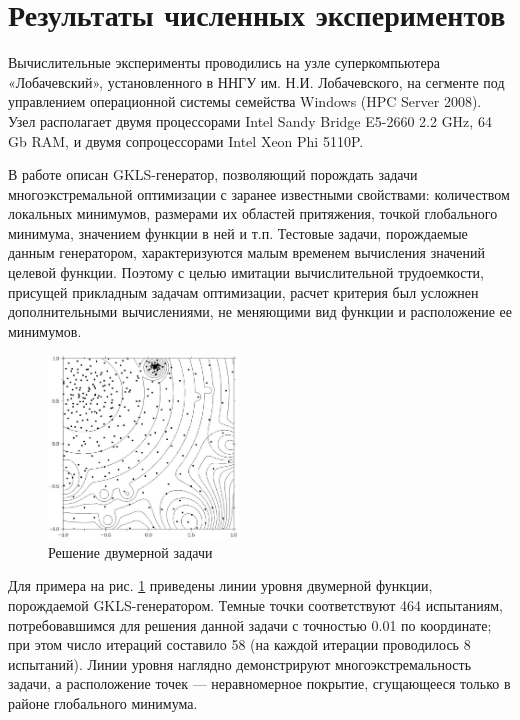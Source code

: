 \section{Результаты численных экспериментов}
Вычислительные эксперименты проводились на узле суперкомпьютера «Лобачевский», установленного в ННГУ им. Н.И. Лобачевского, на сегменте под управлением операционной системы семейства Windows (HPC Server 2008). Узел располагает двумя процессорами Intel Sandy Bridge E5-2660 2.2 GHz, 64 Gb RAM, и двумя сопроцессорами Intel Xeon Phi 5110P.
\par
В работе \cite{gklsPaper} описан GKLS-генератор, позволяющий порождать задачи многоэкстремальной оптимизации с заранее известными свойствами: количеством локальных минимумов, размерами их областей притяжения, точкой глобального минимума, значением функции в ней и т.п. Тестовые задачи, порождаемые данным генератором, характеризуются малым временем вычисления значений целевой функции. Поэтому с целью имитации вычислительной трудоемкости, присущей прикладным задачам оптимизации, расчет критерия был усложнен дополнительными вычислениями, не меняющими вид функции и расположение ее минимумов.
\begin{figure}[h!]
    \centering
		\includegraphics[width=0.45\textwidth]{isolines.png}
		\caption{Решение двумерной задачи}\label{fig:isolines}
\end{figure}
\par
Для примера на рис. \ref{fig:isolines} приведены линии уровня двумерной функции, порождаемой GKLS-генератором. Темные точки соответствуют 464 испытаниям, потребовавшимся для решения данной задачи с точностью 0.01 по координате; при этом число итераций составило 58 (на каждой итерации проводилось 8 испытаний). Линии уровня наглядно демонстрируют многоэкстремальность задачи, а расположение точек --- неравномерное покрытие, сгущающееся только в районе глобального минимума.
\par
